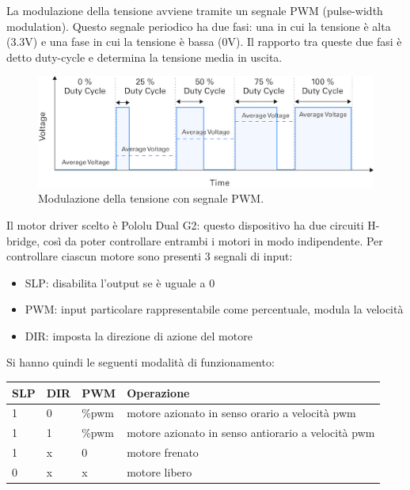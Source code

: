 La modulazione della tensione avviene tramite un segnale PWM (pulse-width modulation). Questo segnale periodico ha due fasi: una in cui la tensione è alta (3.3V) e una fase in cui la tensione è bassa (0V). Il rapporto tra queste due fasi è detto duty-cycle e determina la tensione media in uscita.

\begin{figure}[H]
\centering
\includegraphics[width=\textwidth]{images/pwm.jpg}
\caption{Modulazione della tensione con segnale PWM.}
\end{figure}


Il motor driver scelto è Pololu Dual G2: questo dispositivo ha due circuiti H-bridge, così da poter controllare entrambi i motori in modo indipendente.
Per controllare ciascun motore sono presenti 3 segnali di input:
\begin{itemize}
    \item SLP: disabilita l'output se è uguale a 0
    \item PWM: input particolare rappresentabile come percentuale, modula la velocità
    \item DIR: imposta la direzione di azione del motore
\end{itemize}

Si hanno quindi le seguenti modalità di funzionamento:
\begin{table}[H]
    \centering
    \begin{tabular}{|l|l|l|l|}
    \hline
    SLP & DIR & PWM & Operazione                            \\ \hline
    1   & 0   & \%pwm & motore azionato in senso orario a velocità pwm \\
    1   & 1   & \%pwm & motore azionato in senso antiorario a velocità pwm         \\
    1   & x   & 0   & motore frenato                        \\
    0   & x   & x   & motore libero                     \\ \hline
    \end{tabular}
\end{table}

